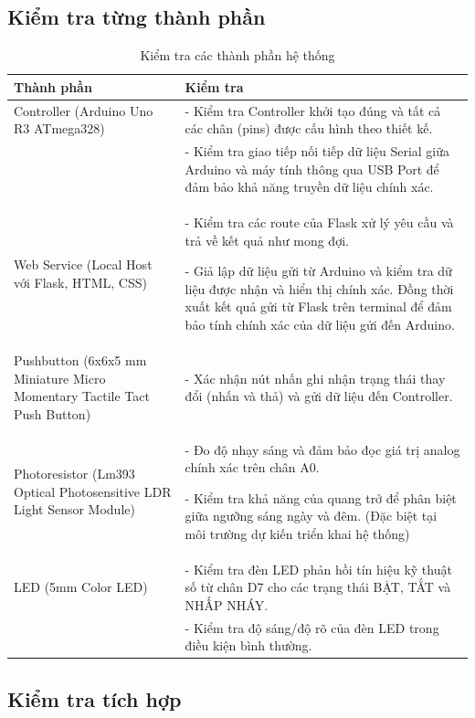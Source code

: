 \subsection{Kiểm tra từng thành phần}
\begin{table}[h!]
\centering
\small
\begin{tabular}{|p{4cm}|p{10cm}|}
\hline
\textbf{Thành phần} & \textbf{Kiểm tra} \\ \hline
Controller (Arduino Uno R3 ATmega328) & - Kiểm tra Controller khởi tạo đúng và tất cả các chân (pins) được cấu hình theo thiết kế. \\
& - Kiểm tra giao tiếp nối tiếp dữ liệu Serial giữa Arduino và máy tính thông qua USB Port để đảm bảo khả năng truyền dữ liệu chính xác. \\ \hline
Web Service (Local Host với Flask, HTML, CSS) & - Kiểm tra các route của Flask xử lý yêu cầu và trả về kết quả như mong đợi.


- Giả lập dữ liệu gửi từ Arduino và kiểm tra dữ liệu được nhận và hiển thị chính xác. Đồng thời xuất kết quả gửi từ Flask trên terminal để đảm bảo tính chính xác của dữ liệu gửi đến Arduino. \\ \hline
Pushbutton (6x6x5 mm Miniature Micro Momentary Tactile Tact Push Button) & - Xác nhận nút nhấn ghi nhận trạng thái thay đổi (nhấn và thả) và gửi dữ liệu đến Controller. \\ \hline
Photoresistor (Lm393 Optical Photosensitive LDR Light Sensor Module) & - Đo độ nhạy sáng và đảm bảo đọc giá trị analog chính xác trên chân A0. 


- Kiểm tra khả năng của quang trở để phân biệt giữa ngưỡng sáng ngày và đêm. (Đặc biệt tại môi trường dự kiến triển khai hệ thống) \\ \hline
LED (5mm Color LED) & - Kiểm tra đèn LED phản hồi tín hiệu kỹ thuật số từ chân D7 cho các trạng thái BẬT, TẮT và NHẤP NHÁY. \\
& - Kiểm tra độ sáng/độ rõ của đèn LED trong điều kiện bình thường. \\ \hline
\end{tabular}
\caption{Kiểm tra các thành phần hệ thống}
\label{tab:component_checks}
\end{table}

\pagebreak
\subsection{Kiểm tra tích hợp}

